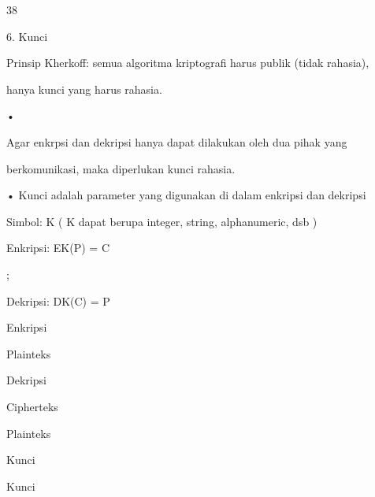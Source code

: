 \documentclass{article}
\begin{document}

38

6. Kunci







Prinsip Kherkoff: semua algoritma kriptografi harus publik (tidak rahasia), 

hanya kunci yang harus rahasia.

•

 Agar enkrpsi dan dekripsi hanya dapat dilakukan oleh dua pihak yang 

berkomunikasi, maka diperlukan kunci rahasia.

• Kunci adalah parameter yang digunakan di dalam enkripsi dan dekripsi 

     Simbol: K    ( K dapat berupa integer, string, alphanumeric, dsb )


Enkripsi: EK(P) = C 

; 

Dekripsi: DK(C) = P

Enkripsi

Plainteks

Dekripsi

Cipherteks

Plainteks

Kunci

Kunci
\end{document}
